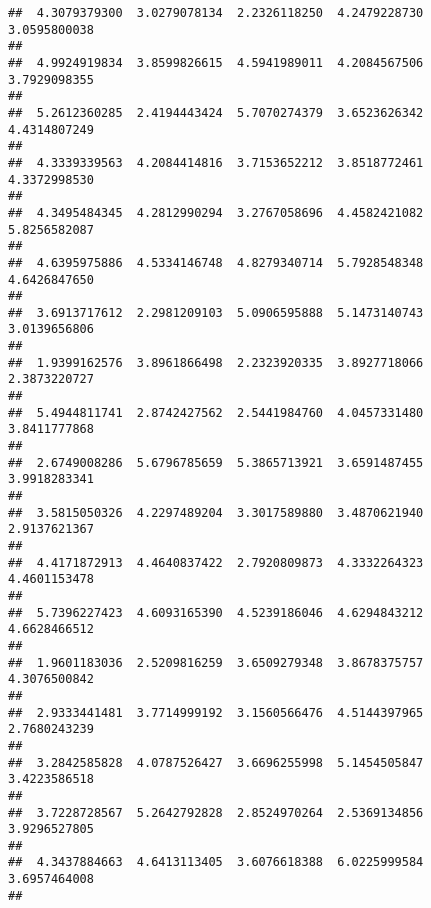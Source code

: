 \documentclass[]{article}
\begin{document}
\begin{verbatim}
##  4.3079379300  3.0279078134  2.2326118250  4.2479228730  3.0595800038 
##                                                                       
##  4.9924919834  3.8599826615  4.5941989011  4.2084567506  3.7929098355 
##                                                                       
##  5.2612360285  2.4194443424  5.7070274379  3.6523626342  4.4314807249 
##                                                                       
##  4.3339339563  4.2084414816  3.7153652212  3.8518772461  4.3372998530 
##                                                                       
##  4.3495484345  4.2812990294  3.2767058696  4.4582421082  5.8256582087 
##                                                                       
##  4.6395975886  4.5334146748  4.8279340714  5.7928548348  4.6426847650 
##                                                                       
##  3.6913717612  2.2981209103  5.0906595888  5.1473140743  3.0139656806 
##                                                                       
##  1.9399162576  3.8961866498  2.2323920335  3.8927718066  2.3873220727 
##                                                                       
##  5.4944811741  2.8742427562  2.5441984760  4.0457331480  3.8411777868 
##                                                                       
##  2.6749008286  5.6796785659  5.3865713921  3.6591487455  3.9918283341 
##                                                                       
##  3.5815050326  4.2297489204  3.3017589880  3.4870621940  2.9137621367 
##                                                                       
##  4.4171872913  4.4640837422  2.7920809873  4.3332264323  4.4601153478 
##                                                                       
##  5.7396227423  4.6093165390  4.5239186046  4.6294843212  4.6628466512 
##                                                                       
##  1.9601183036  2.5209816259  3.6509279348  3.8678375757  4.3076500842 
##                                                                       
##  2.9333441481  3.7714999192  3.1560566476  4.5144397965  2.7680243239 
##                                                                       
##  3.2842585828  4.0787526427  3.6696255998  5.1454505847  3.4223586518 
##                                                                       
##  3.7228728567  5.2642792828  2.8524970264  2.5369134856  3.9296527805 
##                                                                       
##  4.3437884663  4.6413113405  3.6076618388  6.0225999584  3.6957464008 
##                                                                       

\end{verbatim}
\end{document}
